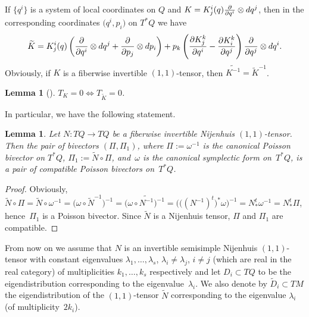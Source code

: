 \documentclass[11pt]{article}
\numberwithin{equation}{section}
\newtheorem{Lemma}[Theorem]{Lemma}
\begin{document}
If $\{q^i\}$ is a system of local coordinates on $Q$ and $K=K^i_j (q) \frac{\partial}{\partial q^i } \otimes {\rm d}q^j $, then in the corresponding coordinates $\big(q^i, p_i\big)$ on $T^*Q$ we have
\begin{gather*}
\widetilde{K}= K^i_j (q) \left( \frac{\partial}{\partial q^i } \otimes {\rm d}q^j + \frac{\partial}{\partial p_j } \otimes {\rm d}p_i \right)
+ p_k \left( \frac{\partial K^k_j }{\partial q^i} - \frac{\partial K^k_i }{\partial q^j} \right) \frac{\partial}{\partial q^j}\otimes {\rm d}q^i
.\end{gather*}
Obviously, if $K$ is a fiberwise invertible $(1,1)$-tensor, then $\widetilde{K^{-1}}=\widetilde{K}^{-1}$.

\begin{Lemma}[\cite{t12}]\label{tors} $T_K=0\Longleftrightarrow T_{\widetilde{K}}=0$.
\end{Lemma}

In particular, we have the following statement.

\begin{Lemma}\label{constt}Let $N\colon TQ\to TQ$ be a fiberwise invertible Nijenhuis $(1,1)$-tensor. Then the pair of bivectors $(\Pi,\Pi_1)$, where $\Pi:=\omega^{-1}$ is the canonical Poisson bivector on $T^*Q$, $\Pi_1:=\widetilde{N}\circ\Pi$, and~$\omega $ is the canonical symplectic form on~$T^*Q$, is a pair of compatible Poisson bivectors on~$T^*Q$.
\end{Lemma}

\begin{proof} Obviously, $\widetilde{N}\circ\Pi=\widetilde{N}\circ \omega^{-1}=\big(\omega\circ \widetilde{N}^{-1}\big)^{-1}=\big(\omega\circ \widetilde{N^{-1}}\big)^{-1}=\big(\big((N^{-1})^t\big)^*\omega\big)^{-1}=N^t_*\omega^{-1}=N^t_*\Pi$, hence~$\Pi_1$ is a Poisson bivector. Since $\widetilde{N}$ is a Nijenhuis tensor, $\Pi$ and $\Pi_1$ are compatible.
\end{proof}

From now on we assume that $N$ is an invertible semisimple Nijenhuis $(1,1)$-tensor with constant eigenvalues $\lambda_1,\dots,\lambda_s$, $\lambda_i\not=\lambda_j$, $i\not=j$ (which are real in the real category) of multiplicities $k_1,\dots,k_s$ respectively and let $D_i \subset TQ$ to be the eigendistribution corresponding to the eigenvalue~$\lambda_i$. We also denote by $\widetilde{ D}_i \subset TM$ the eigendistribution of the $(1,1)$-tensor $\widetilde{N}$ corresponding to the eigenvalue $\lambda_i$ (of multiplicity~$2k_i$).
\end{document}
